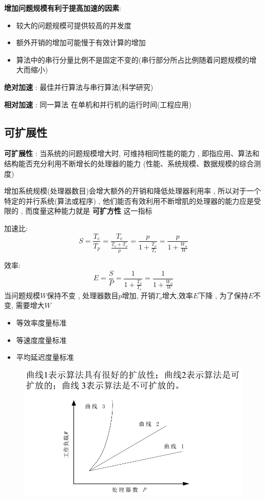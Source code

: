 \documentclass[UTF8,a4paper]{ctexart}
\begin{document}
  \textbf{增加问题规模有利于提高加速的因素}:
  \begin{itemize}
    \item 较大的问题规模可提供较高的并发度
    \item 额外开销的增加可能慢于有效计算的增加
    \item 算法中的串行分量比例不是固定不变的(串行部分所占比例随着问题规模的增大而缩小)
  \end{itemize}

  \textbf{绝对加速} : 最佳并行算法与串行算法(科学研究)

  \textbf{相对加速} : 同一算法 在单机和并行机的运行时间(工程应用)

  \subsection{可扩展性}

  \textbf{可扩展性} : 当系统的问题规模增大时, 可维持相同性能的能力 , 即指应用、算法和结构能否充分利用不断增长的处理器的能力 (性能、系统规模、数据规模的综合测度)

  增加系统规模(处理器数目)会增大额外的开销和降低处理器利用率 , 所以对于一个特定的并行系统(算法或程序) , 他们能否有效利用不断增肌的处理器的能力应是受限的 , 而度量这种能力就是 \textbf{可扩方性} 这一指标

  加速比:
  \[S = \frac{T_e}{T_p} = \frac{T_e}{\frac{T_e + T_o}{p}} = \frac{p}{1 + \frac{T_o}{T_e}} = \frac{p}{1 + \frac{W_o}{W}}\]

  效率:
  \[E = \frac{S}{P}=\frac{1}{1 + \frac{T_o}{T_e}} = \frac{1}{1 + \frac{W_o}{W}}\]
  当问题规模$W$保持不变 , 处理器数目$p$增加, 开销$T_o$增大,效率$E$下降 , 为了保持$E$不变, 需要增大$W$

  \begin{itemize}
    \item 等效率度量标准
    \item 等速度度量标准
    \item 平均延迟度量标准
  \end{itemize}

  \begin{figure}[H]
    \centering
    \includegraphics[scale = 0.3]{assets/ParallelComputing_c2124.png}
  \end{figure}
\end{document}
